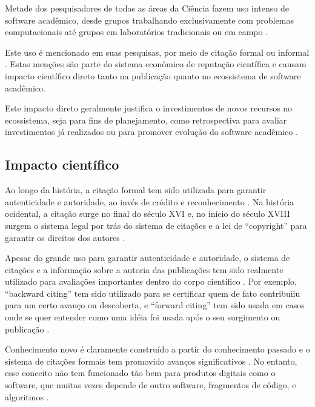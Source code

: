 
Metade dos pesquisadores de todas as áreas da Ciência fazem uso intenso de
software acadêmico, desde grupos trabalhando exclusivamente com problemas
computacionais até grupos em laboratórios tradicionais ou em campo
\cite{wilson2014best}.

Este uso é mencionado em suas pesquisas, por meio de citação formal ou informal
\cite{smith2016software}.
Estas menções são parte do sistema econômico de reputação científica e causam
impacto científico direto tanto na publicação quanto no ecossistema de software
acadêmico\cite{katz2014transitive}.

Este impacto direto geralmente justifica o investimentos de novos recursos no
ecossistema, seja para fins de planejamento, como retrospectiva para avaliar
investimentos já realizados ou para promover evolução do software acadêmico
\cite{howison2015understanding}.

\subsection{Impacto científico}

Ao longo da história, a citação formal tem sido utilizada para garantir
autenticidade e autoridade, ao invés de crédito e reconhecimento
\cite{katz2014transitive}.
Na história ocidental, a citação surge no final do século XVI e, no início do
século XVIII surgem o sistema legal por trás do sistema de citações e a lei de
``copyright'' para garantir os direitos dos autores \cite{katz2014transitive}.

Apesar do grande uso para garantir autenticidade e autoridade, o sistema de
citações e a informação sobre a autoria das publicações tem sido realmente
utilizado para avaliações importantes dentro do corpo científico
\cite{katz2014transitive}.
Por exemplo, ``backward citing'' tem sido utilizado para se certificar quem de
fato contribuiiu para um certo avanço ou descoberta, e ``forward citing'' tem
sido usada em casos onde se quer entender como uma idéia foi usada após o seu
surgimento ou publicação \cite{katz2014transitive}.


Conhecimento novo é claramente construído a partir do conhecimento passado e o
sistema de citações formais tem promovido avanços significativos
\cite{katz2014transitive}.
No entanto, esse conceito não tem funcionado tão bem para produtos digitais
como o software, que muitas vezes depende de outro software, fragmentos de
código, e algoritmos \cite{katz2014transitive}.

